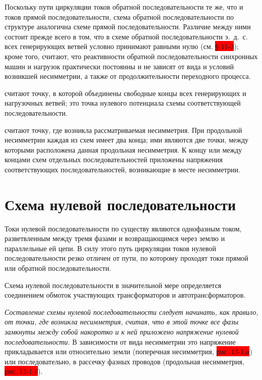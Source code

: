 Поскольку пути циркуляции токов обратной последовательности те же, что и токов прямой последовательности, схема обратной последовательности по структуре аналогична схеме прямой последовательности. Различие между ними состоит прежде всего в том, что в схеме обратной последовательности э.~д.~с. всех генерирующих ветвей условно принимают равными нулю (см. \colorbox{red}{§ 11-3}); кроме того, считают, что реактивности обратной последовательности синхронных машин и нагрузок практически постоянны и не зависят от вида и условий возникшей несимметрии, а также от продолжительности переходного процесса.

 считают точку, в которой объединены свободные концы всех генерирующих и нагрузочных ветвей; это точка нулевого потенциала схемы соответствующей последовательности.

 считают точку, где возникла рассматриваемая несимметрия. При продольной несимметрии каждая из схем имеет два конца; ими являются две точки, между которыми расположена данная продольная несимметрия. К концу или между концами схем отдельных последовательностей приложены напряжения соответствующих последовательностей, возникающие в месте несимметрии.

\section{Схема нулевой последовательности}
\label{sec:13-3 skhema_nulevoi_posledovatelnosti}

Токи нулевой последовательности по существу являются однофазным током, разветвленным между тремя фазами и возвращающимся через землю и параллельные ей цепи. В силу этого путь циркуляции токов нулевой последовательности резко отличен от пути, по которому проходят токи прямой или обратной последовательности.

Схема нулевой последовательности в значительной мере определяется соединением обмоток участвующих трансформаторов и автотрансформаторов.

\textit{Составление схемы нулевой последовательности следует начинать, как правило, от точки, где возникла несимметрия, считая, что в этой точке все фазы замкнуты между собой накоротко и к ней приложено напряжение нулевой последовательности.} В зависимости от вида несимметрии это напряжение прикладывается или относительно земли (поперечная несимметрия, \colorbox{red}{рис. 13-1,\textit{а}}) или последовательно, в рассечку фазных проводов (продольная несимметрия, \colorbox{red}{рис. 13-1,\textit{6}}).

